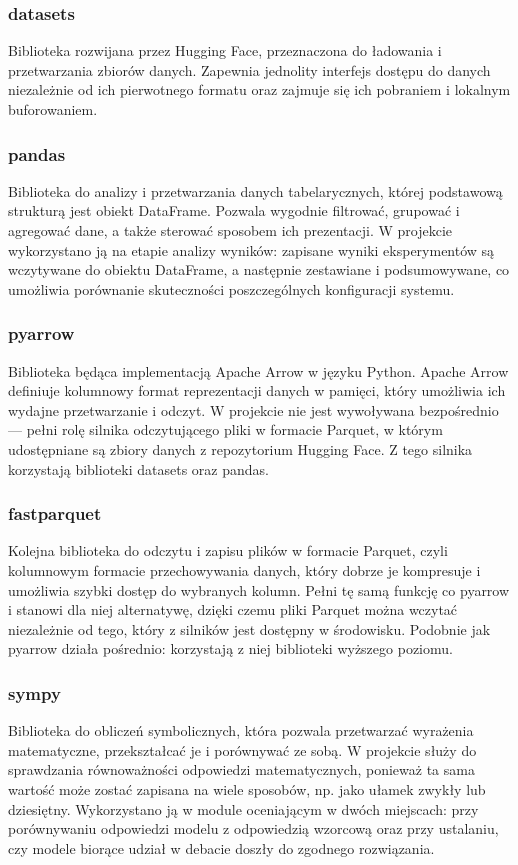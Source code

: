 \subsubsection{datasets}
Biblioteka rozwijana przez Hugging Face, przeznaczona do ładowania i przetwarzania zbiorów danych. Zapewnia jednolity interfejs dostępu do danych niezależnie od ich pierwotnego formatu oraz zajmuje się ich pobraniem i lokalnym buforowaniem.

\subsubsection{pandas}
Biblioteka do analizy i przetwarzania danych tabelarycznych, której podstawową strukturą jest obiekt DataFrame. Pozwala wygodnie filtrować, grupować i agregować dane, a także sterować sposobem ich prezentacji. W projekcie wykorzystano ją na etapie analizy wyników: zapisane wyniki eksperymentów są wczytywane do obiektu DataFrame, a następnie zestawiane i podsumowywane, co umożliwia porównanie skuteczności poszczególnych konfiguracji systemu.

\subsubsection{pyarrow}
Biblioteka będąca implementacją Apache Arrow w języku Python. Apache Arrow definiuje kolumnowy format reprezentacji danych w pamięci, który umożliwia ich wydajne przetwarzanie i odczyt. W projekcie nie jest wywoływana bezpośrednio — pełni rolę silnika odczytującego pliki w formacie Parquet, w którym udostępniane są zbiory danych z repozytorium Hugging Face. Z tego silnika korzystają biblioteki datasets oraz pandas.

\subsubsection{fastparquet}
Kolejna biblioteka do odczytu i zapisu plików w formacie Parquet, czyli kolumnowym formacie przechowywania danych, który dobrze je kompresuje i umożliwia szybki dostęp do wybranych kolumn. Pełni tę samą funkcję co pyarrow i stanowi dla niej alternatywę, dzięki czemu pliki Parquet można wczytać niezależnie od tego, który z silników jest dostępny w środowisku. Podobnie jak pyarrow działa pośrednio: korzystają z niej biblioteki wyższego poziomu.

\subsubsection{sympy}
Biblioteka do obliczeń symbolicznych, która pozwala przetwarzać wyrażenia matematyczne, przekształcać je i porównywać ze sobą. W projekcie służy do sprawdzania równoważności odpowiedzi matematycznych, ponieważ ta sama wartość może zostać zapisana na wiele sposobów, np. jako ułamek zwykły lub dziesiętny. Wykorzystano ją w module oceniającym w dwóch miejscach: przy porównywaniu odpowiedzi modelu z odpowiedzią wzorcową oraz przy ustalaniu, czy modele biorące udział w debacie doszły do zgodnego rozwiązania.

